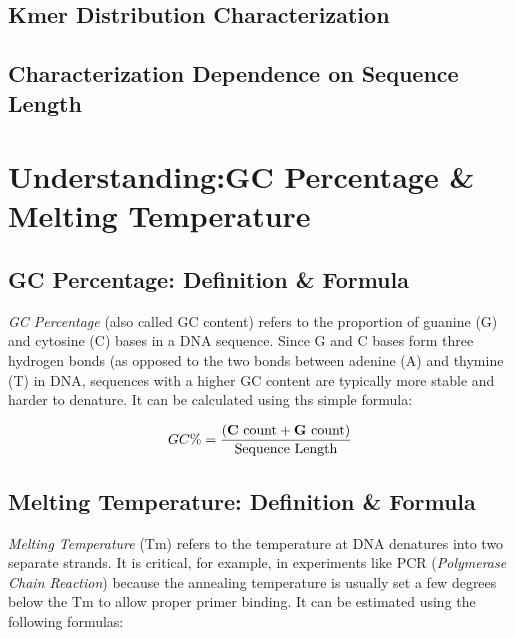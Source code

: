 \documentclass[
  letterpaper,
]{article}
\begin{document}
\subsection{Kmer Distribution
Characterization}\label{kmer-distribution-characterization}

\subsection{Characterization Dependence on Sequence
Length}\label{characterization-dependence-on-sequence-length}

\section{\texorpdfstring{Understanding:\newline GC Percentage \& Melting
Temperature}{Understanding:GC Percentage \& Melting Temperature}}\label{understandinggc-percentage-melting-temperature}

\subsection{GC Percentage: Definition \&
Formula}\label{gc-percentage-definition-formula}

\emph{GC Percentage} (also called GC content) refers to the proportion
of guanine (G) and cytosine (C) bases in a DNA sequence. Since G and C
bases form three hydrogen bonds (as opposed to the two bonds between
adenine (A) and thymine (T) in DNA, sequences with a higher GC content
are typically more stable and harder to denature. It can be calculated
using ths simple formula:

\small

\begin{equation}
GC\% = \frac{(\text{\textbf{C} count} + \text{\textbf{G} count})}{\text{Sequence Length}}
\end{equation} \normalsize

\subsection{Melting Temperature: Definition \&
Formula}\label{melting-temperature-definition-formula}

\emph{Melting Temperature} (Tm) refers to the temperature at DNA
denatures into two separate strands. It is critical, for example, in
experiments like PCR (\emph{Polymerase Chain Reaction}) because the
annealing temperature is usually set a few degrees below the Tm to allow
proper primer binding. It can be estimated using the following formulas:
\vspace{0.08cm}
\end{document}
